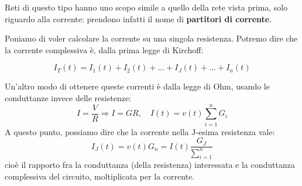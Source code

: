\documentclass[a4paper,11pt]{article}
\begin{document}
Reti di questo tipo hanno uno scopo simile a quello della rete vista prima, solo riguardo alla corrente: prendono infatti il nome di \textbf{partitori di corrente}.

Poniamo di voler calcolare la corrente su una singola resistenza. 
Potremo dire che la corrente complessiva è, dalla prima legge di Kirchoff:

$$
I_T(t) = I_1(t) + I_2(t) + ... + I_J(t) + ... + I_n(t)
$$

Un'altro modo di ottenere queste correnti è dalla legge di Ohm, usando le conduttanze invece delle resistenze:
$$ 
I = \frac{V}{R} \Rightarrow I = GR, \quad I(t) = v(t) \sum_{i=1}^n G_i
$$
A questo punto, possiamo dire che la corrente nella J-esima resistenza vale:
$$
I_J(t) = v(t) G_n = I(t) \frac{G_J}{\sum_{i=1}^n} 
$$
cioè il rapporto fra la conduttanza (della resistenza) interessata e la conduttanza complessiva del circuito, moltiplicata per la corrente.
\end{document}
